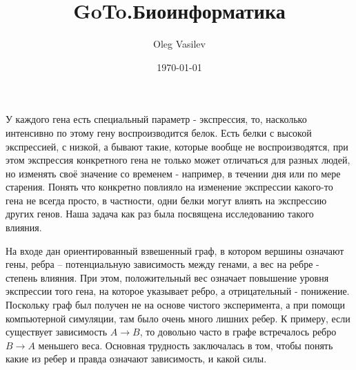 \documentclass[a4paper, 14pt]{article}
\title{GoTo.Биоинформатика}
\date{\today}
\author{Oleg Vasilev}
\theoremstyle{definition}
\theoremstyle{plain}
\theoremstyle{remark}
\begin{document}
\maketitle
У каждого гена есть специальный параметр - экспрессия, то, насколько интенсивно по этому гену воспроизводится белок. Есть белки с высокой экспрессией, с низкой, а бывают такие, которые вообще не воспроизводятся, при этом экспрессия конкретного гена не только может отличаться для разных людей, но изменять своё значение со временем - например, в течении дня или по мере старения. Понять что конкретно повлияло на изменение экспрессии какого-то гена не всегда просто, в частности, одни белки могут влиять на экспрессию других генов. Наша задача как раз была посвящена исследованию такого влияния. 

На входе дан ориентированный взвешенный граф, в котором вершины означают гены, ребра -- потенциальную зависимость между генами, а вес на ребре - степень влияния. При этом, положительный вес означает повышение уровня экспрессии того гена, на которое указывает ребро, а отрицательный - понижение. Поскольку граф был получен не на основе чистого эксперимента, а при помощи компьютерной симуляции, там было очень много лишних ребер. К примеру, если существует зависимость $A \to B$, то довольно часто в графе встречалось ребро $B \to A$ меньшего веса. Основная трудность заключалась в том, чтобы понять какие из ребер и правда означают зависимость, и какой силы.
\end{document}
